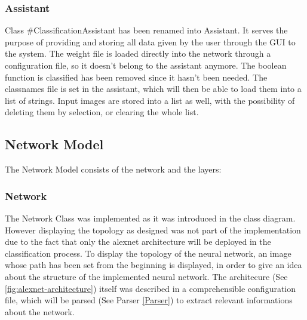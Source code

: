 \documentclass[parskip=full]{scrartcl}
\newcommand\tab[1][1cm]{\hspace*{#1}}
\begin{document}
	\subsubsection {Assistant}
	\tab Class #ClassificationAssistant has been renamed into Assistant. It serves the purpose of providing and storing all data given by the user through the GUI to the system. The weight file is loaded directly into the network through a configuration file, so it doesn't belong to the assistant anymore. The boolean function is classified has been removed since it hasn't been needed. The classnames file is set in the assistant, which will then be able to load them into a list of strings. Input images are stored into a list as well, with the possibility of deleting them by selection, or clearing the whole list.

	\subsection {Network Model}
	\tab The Network Model consists of the network and the layers:
	
		\subsubsection {Network}
		\tab The Network Class was implemented as it was introduced in the class diagram. However displaying the topology  as designed was not part of the implementation due to the fact that only the alexnet architecture will be deployed in the classification process. To display the topology of the neural network, an image whose path has been set from the beginning is displayed, in order to give an idea about the structure of the implemented neural network.
		The architecure (See \ref{fig:alexnet-architecture}) itself was described in a comprehensible configuration file, which will be parsed (See Parser \ref{Parser}) to extract relevant informations about the network.
		
\end{document}
